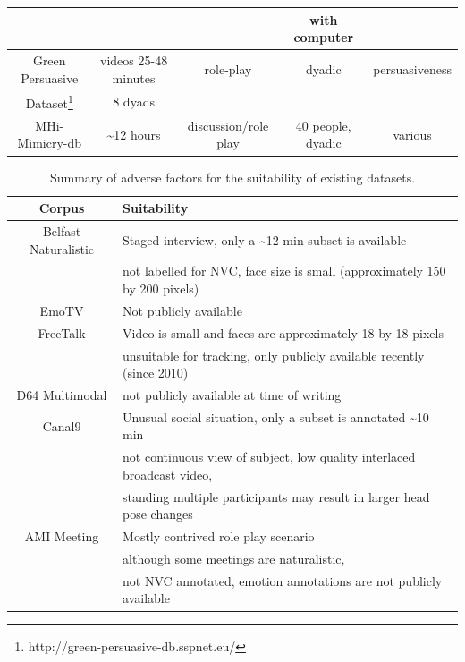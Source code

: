 \begin{table}
\begin{minipage}{0.99 \columnwidth}
\begin{tabular}{ | c | c | c | c | c |}
& & & with computer & \\
\hline
Green Persuasive& videos 25-48 minutes & role-play & dyadic & persuasiveness \\%
Dataset\footnote{http://green-persuasive-db.sspnet.eu/} & 8 dyads & & & \\
\hline
MHi-Mimicry-db\cite{Sun2011} & \textasciitilde12 hours & discussion/role play & 40 people, dyadic & various \\
\hline
\end{tabular}
\end{minipage}
\normalsize
\label{TableAvailableDatasets}
\end{table}

\begin{table}
\centering
\caption{Summary of adverse factors for the suitability of existing datasets.}
\tiny
\begin{minipage}{0.99 \columnwidth}
\begin{tabular}{ | c | l |}
\hline
Corpus & Suitability \\
\hline
Belfast Naturalistic \cite{Cowie2005} & Staged interview, only a \textasciitilde12 min subset is available \\
& not labelled for \ac{NVC}, face size is small (approximately 150 by 200 pixels) \\
\hline
EmoTV \cite{Devillers2008} & Not publicly available \\
\hline
FreeTalk \cite{Campbell2010} & Video is small and faces are approximately 18 by 18 pixels \\
& unsuitable for tracking, only publicly available recently (since 2010) \\
\hline
D64 Multimodal \cite{Oertel2010} & not publicly available at time of writing \\
\hline
Canal9 \cite{Vinciarelli2009}& Unusual social situation, only a subset is annotated \textasciitilde10 min \\
 & not continuous view of subject, low quality interlaced broadcast video,\\
 & standing multiple participants may result in larger head pose changes \\
\hline
AMI Meeting \cite{Carletta2007}& Mostly contrived role play scenario \\
& although some meetings are naturalistic, \\
& not \ac{NVC} annotated, emotion annotations are not publicly available \\

\end{tabular}
\end{minipage}
\end{table}
